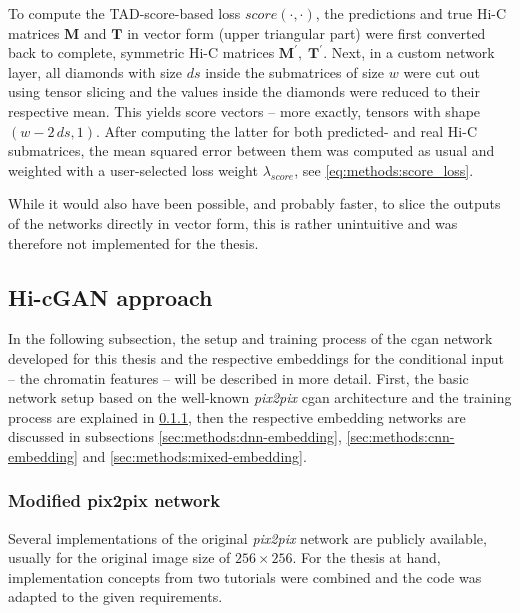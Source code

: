 To compute the TAD-score-based loss $\mathit{score}(\cdot,\cdot)$, the predictions and true Hi-C matrices $\mathbf{M}$ and $\mathbf{T}$ in vector form (upper triangular part)
were first converted back to complete, symmetric Hi-C matrices $\mathbf{M}^\prime,\; \mathbf{T}^\prime$. 
Next, in a custom network layer, all diamonds with size $ds$ inside the submatrices of size $w$ were cut out using tensor slicing and the values inside the diamonds were reduced to their respective mean.
This yields score vectors -- more exactly, tensors with shape $(w - 2\,ds, 1)$.
After computing the latter for both predicted- and real Hi-C submatrices, the mean squared error between them was computed as usual and weighted with 
a user-selected loss weight $\lambda_\mathit{score}$, see \cref{eq:methods:score_loss}.

While it would also have been possible, and probably faster, to slice the outputs of the networks directly in vector form, 
this is rather unintuitive and was therefore not implemented for the thesis. 

\subsection{Hi-cGAN approach} \label{sec:methods:hicgan}
In the following subsection, the setup and training process of the \acrshort{cgan} network developed for this thesis and the respective
embeddings for the conditional input -- the chromatin features -- will be described in more detail.
First, the basic network setup based on the well-known \emph{pix2pix} \acrshort{cgan} architecture \cite{Isola2017} and the training process
are explained in \cref{sec:methods:cGAN_initial}, then the respective embedding networks are discussed in subsections \ref{sec:methods:dnn-embedding},
\ref{sec:methods:cnn-embedding} and \ref{sec:methods:mixed-embedding}.

\subsubsection{Modified pix2pix network}\label{sec:methods:cGAN_initial}
Several implementations of the original \emph{pix2pix} network \cite{Isola2017} are publicly available, usually for the original image size of $256\times256$.
For the thesis at hand, implementation concepts from two tutorials \cite{tfpix2pix2020, brownlee2019} were combined and the code was adapted to the given requirements.

